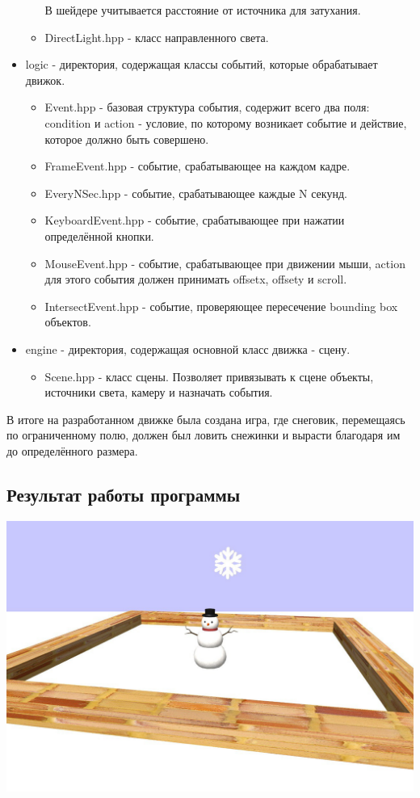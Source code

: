 \documentclass[12pt]{article}
\begin{document}
\begin{itemize}
\begin{itemize}
            В шейдере учитывается расстояние от источника для затухания.
            \item DirectLight.hpp - класс направленного света.
        \end{itemize}
    \item logic - директория, содержащая классы событий, которые обрабатывает движок.
        \begin{itemize}
            \item Event.hpp - базовая структура события, содержит всего два поля: condition и action - условие, по которому возникает
            событие и действие, которое должно быть совершено. 
            \item FrameEvent.hpp - событие, срабатывающее на каждом кадре.
            \item EveryNSec.hpp - событие, срабатывающее каждые N секунд.
            \item KeyboardEvent.hpp - событие, срабатывающее при нажатии определённой кнопки.
            \item MouseEvent.hpp - событие, срабатывающее при движении мыши, action для этого события должен принимать offsetx, offsety и scroll.
            \item IntersectEvent.hpp - событие, проверяющее пересечение bounding box объектов.
        \end{itemize}
    \item engine - директория, содержащая основной класс движка - сцену.
        \begin{itemize}
            \item Scene.hpp - класс сцены. Позволяет привязывать к сцене объекты, источники света, камеру и назначать события.
        \end{itemize}
\end{itemize}

В итоге на разработанном движке была создана игра, где снеговик, перемещаясь по ограниченному полю, 
должен был ловить снежинки и вырасти благодаря им до определённого размера.

\subsection*{Результат работы программы}

\includegraphics[width=15cm]{demo.jpg}
\end{document}
